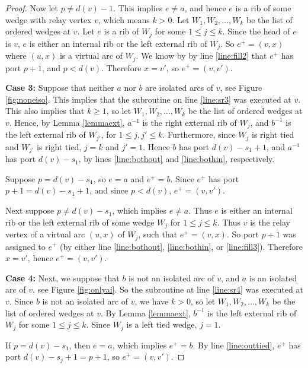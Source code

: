 \documentclass[12pt,letterpaper,oneside]{book}
\begin{document}
\begin{proof}
Now let $p\ne d(v)-1$.  This implies $e\ne a$, and hence 
$e$ is a rib of some wedge with relay vertex $v$, which means $k>0$.    
Let $W_1,W_2,\ldots,W_k$ be 
the list of ordered wedges at $v$.  Let $e$ is a rib of $W_j$ for some $1\le j\le k$. 
Since the head of $e$ is $v$, $e$ is either an internal rib or the left external rib of $W_j$.  
So $e^+ = (v,x)$ where $(u,x)$ is a 
virtual arc of $W_j$.   
We know by by line \ref{line:fill2} that $e^+$ has port $p+1$, and $p<d(v)$.  Therefore $x=v'$, so $e^+=(v,v')$.

  
\noindent\textbf{Case 3: } Suppose that neither $a$ nor $b$ are isolated arcs of $v$, see Figure \ref{fig:noneiso}.  This implies 
that the subroutine on line \ref{line:sr3} was executed at $v$.  This also implies that $k\ge 1$, so let 
$W_1,W_2,\ldots,W_k$ be the list of ordered wedges at $v$.  
Hence, by Lemma \ref{lemmaext}, $a^{-1}$ is the right external rib of $W_j$, 
and $b^{-1}$ is the left external rib of $W_{j'}$, for $1\le j,j' \le k$.  Furthermore, since $W_j$ is right tied and 
$W_{j'}$ is right tied, $j=k$ and $j'=1$.  
Hence $b$ has port $d(v)-s_1+1$, and $a^{-1}$ has port $d(v)-s_1$, 
by lines \ref{line:bothout} and \ref{line:bothin}, respectively.  %

Suppose $p=d(v)-s_1$, so $e=a$ and $e^+=b$.  
Since $e^+$ has port $p+1=d(v)-s_1+1$, and since $p<d(v)$, $e^+=(v,v')$. 

Next suppose $p\ne d(v)-s_1$, which implies $e\ne a$.  Thus $e$ is either an 
internal rib or the left external rib of some wedge $W_j$ for $1\le j\le k$.  Thus $v$ is the relay vertex of a virtual arc $(u,x)$ of $W_j$, such 
that $e^+=(v,x)$.  So port $p+1$ was assigned to $e^+$ (by either line  \ref{line:bothout}, \ref{line:bothin}, or \ref{line:fill3}).  
Therefore $x=v'$, hence $e^+=(v,v')$.   


\noindent\textbf{Case 4: } Next, we suppose that $b$ is not an isolated arc of $v$, and $a$ is an isolated arc 
of $v$, see Figure \ref{fig:onlyai}.  %
So the subroutine at line \ref{line:sr4} was executed at $v$.  Since $b$ is not an isolated arc of $v$, we have $k>0$, 
so let $W_1,W_2,\ldots, W_k$ be 
the list of ordered wedges at $v$.  By Lemma \ref{lemmaext}, $b^{-1}$ is the left external rib of $W_j$ for some $1\le j\le k$.  Since 
$W_j$ is a left 
tied wedge, $j=1$.    

If $p=d(v)-s_1$, then $e=a$, which implies 
$e^+ = b$.  By line \ref{line:outtied}, $e^+$ has port $d(v)-s_j+1=p+1$, so $e^+=(v,v')$.  


\end{proof}
\end{document}
